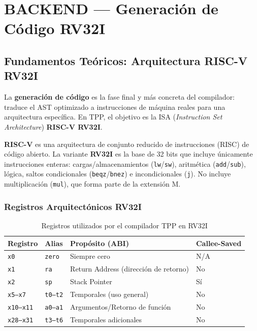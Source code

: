 \chapter{BACKEND — Generación de Código RV32I}

\section{Fundamentos Teóricos: Arquitectura RISC-V RV32I}

La \textbf{generación de código} es la fase final y más concreta del compilador: traduce el AST optimizado a instrucciones de máquina reales para una arquitectura específica. En TPP, el objetivo es la ISA (\textit{Instruction Set Architecture}) \textbf{RISC-V RV32I}.

\textbf{RISC-V} es una arquitectura de conjunto reducido de instrucciones (RISC) de código abierto. La variante \textbf{RV32I} es la base de 32 bits que incluye únicamente instrucciones enteras: cargas/almacenamientos (\texttt{lw}/\texttt{sw}), aritmética (\texttt{add}/\texttt{sub}), lógica, saltos condicionales (\texttt{beqz}/\texttt{bnez}) e incondicionales (\texttt{j}). No incluye multiplicación (\texttt{mul}), que forma parte de la extensión M.

\subsection{Registros Arquitectónicos RV32I}

\begin{table}[H]
\centering
\begin{tabular}{llll}
\toprule
\textbf{Registro} & \textbf{Alias} & \textbf{Propósito (ABI)} & \textbf{Callee-Saved} \\
\midrule
\texttt{x0} & \texttt{zero} & Siempre cero & N/A \\
\texttt{x1} & \texttt{ra} & Return Address (dirección de retorno) & No \\
\texttt{x2} & \texttt{sp} & Stack Pointer & Sí \\
\texttt{x5--x7} & \texttt{t0--t2} & Temporales (uso general) & No \\
\texttt{x10--x11} & \texttt{a0--a1} & Argumentos/Retorno de función & No \\
\texttt{x28--x31} & \texttt{t3--t6} & Temporales adicionales & No \\
\bottomrule
\end{tabular}
\caption{Registros utilizados por el compilador TPP en RV32I}
\label{tab:registros}
\end{table}

